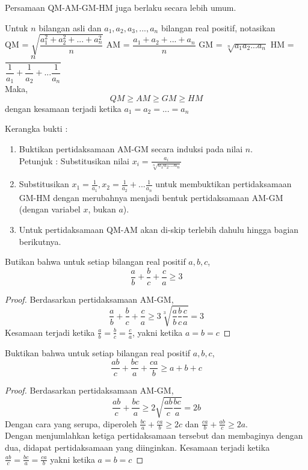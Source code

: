 \documentclass[11pt]{scrartcl}
\begin{document}
Persamaan QM-AM-GM-HM juga berlaku secara lebih umum.\\
\begin{theorem}
Untuk $n$ bilangan asli dan $a_1,a_2,a_3,...,a_n$ bilangan real positif, notasikan \\
QM = $\sqrt{\dfrac{a_1^2 + a_2^2 +... + a_n^2}{n}}$ AM = $\dfrac{a_1 + a_2 + ... + a_n}{n}$ GM = $\sqrt[n]{a_1a_2...a_n}$ \newline HM = $\dfrac{n}{\dfrac{1}{a_1} + \dfrac{1}{a_2} + ... \dfrac{1}{a_n}}$\\
Maka, $$QM \geq AM \geq GM \geq HM$$
dengan kesamaan terjadi ketika $a_1 = a_2 = ... = a_n$
\end{theorem}
Kerangka bukti :
    \begin{enumerate}
        \item Buktikan pertidaksamaan AM-GM secara induksi pada nilai $n$. \\Petunjuk : Substitusikan nilai $x_i = \frac{a_i}{\sqrt[n]{a_1a_2...a_n}}$
        \item Substitusikan $x_1 = \frac{1}{a_1}, x_2 = \frac{1}{a_2} + ... \frac{1}{a_n}$ untuk membuktikan pertidaksamaan GM-HM dengan merubahnya menjadi bentuk pertidaksamaan AM-GM (dengan variabel $x$, bukan $a$).
        \item Untuk pertidaksamaan QM-AM akan di-skip terlebih dahulu hingga bagian berikutnya.
    \end{enumerate}

\begin{example}
Butikan bahwa untuk setiap bilangan real positif $a,b,c$, $$\frac{a}{b} + \frac{b}{c} + \frac{c}{a} \geq 3$$
\end{example}
\begin{proof}
Berdasarkan pertidaksamaan AM-GM, $$\frac{a}{b} + \frac{b}{c} + \frac{c}{a} \geq 3\sqrt[3]{\frac{a}{b}\frac{b}{c}\frac{c}{a}} = 3$$
Kesamaan terjadi ketika $\frac{a}{b} =\frac{b}{c} =\frac{c}{a}$, 
yakni ketika $a = b = c$
\end{proof}
\begin{example}
Buktikan bahwa untuk setiap bilangan real positif $a,b,c$, $$\frac{ab}{c} + \frac{bc}{a} + \frac{ca}{b} \geq a + b +c$$
\end{example}
\begin{proof}
Berdasarkan pertidaksamaan AM-GM, $$\frac{ab}{c} + \frac{bc}{a} \geq 2\sqrt{\frac{ab}{c}\frac{bc}{a}} = 2b $$
Dengan cara yang serupa, diperoleh $\frac{bc}{a} + \frac{ca}{b} \geq 2c$ dan $\frac{ca}{b} + \frac{ab}{c} \geq 2a$.\\
Dengan menjumlahkan ketiga pertidaksamaan tersebut dan membaginya dengan dua, didapat pertidaksamaan yang diinginkan.
Kesamaan terjadi ketika $\frac{ab}{c} = \frac{bc}{a} = \frac{ca}{b}$ yakni ketika $a = b= c$
\end{proof}
\end{document}

